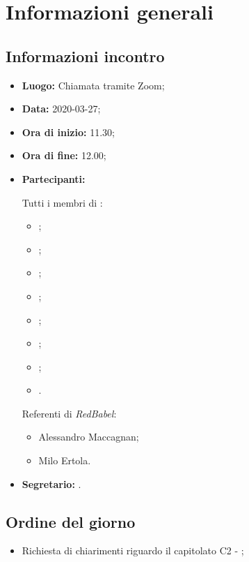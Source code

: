 \section{Informazioni generali}
\subsection{Informazioni incontro}
\begin{itemize}
	\item \textbf{Luogo:} Chiamata tramite Zoom;
	\item \textbf{Data:} 2020-03-27;
	\item \textbf{Ora di inizio:} 11.30;
	\item \textbf{Ora di fine:} 12.00;
	\item \textbf{Partecipanti:}
		
		Tutti i membri di \Gruppo:
		\begin{itemize}
			\item \VB;
			\item \LB;
			\item \NF;
			\item \EG;
			\item \FJ;
			\item \MP;
			\item \AS;
			\item \AZ.
		\end{itemize}
		
		Referenti di \textit{RedBabel}:
		\begin{itemize}
			\item Alessandro Maccagnan;
			\item Milo Ertola.
		\end{itemize}
	\item \textbf{Segretario:} \FJ.
\end{itemize}

\subsection{Ordine del giorno}
\begin{itemize}
	\item Richiesta di chiarimenti riguardo il capitolato C2 - \NomeProgetto;
\end{itemize}
